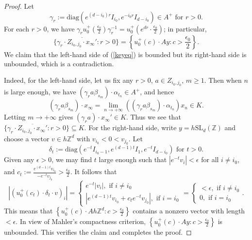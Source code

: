 \documentclass[10pt,a4paper]{amsart}
\newcommand{\SL}{\mathrm{SL}}
\newcommand{\ZZ}{\mathbb{Z}}
\newcommand{\diag}{\mathrm{diag}}
\begin{document}
\begin{proof}
	Let \begin{equation*}
		\gamma_r:=\diag(e^{(d-i_0)r}I_{i_0},e^{-i_0r}I_{d-i_0})\in A^+ \text{ for } r>0.
	\end{equation*}
	For each $r>0$, we have $\gamma_ru_0^+(\frac{\epsilon_0}{2})\gamma_r^{-1}=u_0^+(e^{dr}\cdot\frac{\epsilon_0}{2})$; in particular, \begin{equation}\label{keyeq}
		\{\gamma_r\cdot \overline{Z_{i_0,j_0}\cdot x_{\infty}'}:r>0\}=\left\{u_0^+(c)\cdot Ay:c>\frac{\epsilon_0}{2}\right\}.
	\end{equation}
	We claim that the left-hand side of (\ref{keyeq}) is bounded but its right-hand side is unbounded, which is a contradiction.
	
	Indeed, for the left-hand side, let us fix any $r>0$, $a\in Z_{i_0,j_0}$, $m\geq 1$. Then when $n$ is large enough, we have $(\gamma_r a \beta_{s_m})\cdot \alpha_{t_n}\in A^+$, and hence 
	\begin{equation*}
		(\gamma_r a \beta_{s_m})\cdot x_{\infty}=\lim\limits_{n\to +\infty}\left((\gamma_r a \beta_{s_m})\cdot\alpha_{t_n}\right)x_n\in K.
	\end{equation*}
	Letting $m\to +\infty$ gives $(\gamma_ra)\cdot x_{\infty}'\in K$. Thus we see that $\{\gamma_r\cdot \overline{Z_{i_0,j_0}\cdot x_{\infty}'}:r>0\}\subseteq K$. For the right-hand side, write $y=h\SL_d(\ZZ)$ and choose a vector $v\in h\ZZ^d$ with $v_{i_0}<0<v_{j_0}$. Let \begin{equation*}
		\delta_t:=\diag(e^{-t}I_{i_0-1},e^{(d-1)t}I_1,e^{-t}I_{d-i_0}) \text{ for }t>0.
	\end{equation*}
	Given any $\epsilon>0$, we may find $t$ large enough such that $|e^{-t}v_i|<\epsilon$ for all $i\neq i_0$, and $c_t:=\frac{e^{(d-1)t}v_{i_0}}{-e^{-t}v_{j_0}}>\frac{\epsilon_0}{2}$. It follows that
	\begin{equation*}
		|(u_0^+(c_t)\cdot \delta_t\cdot v)_i|=\begin{cases}
			e^{-t}|v_i|, \text{ if }i\neq i_0\\
			|e^{(d-1)t}v_{i_0}+c_te^{-t}v_{j_0}|, \text{ if }i=i_0
		\end{cases}
		=\begin{cases}
			<\epsilon, \text{ if }i\neq i_0\\
			0, \text{ if }i=i_0
		\end{cases}.
	\end{equation*}
	This means that $\left\{u_0^+(c)\cdot Ah\ZZ^d:c>\frac{\epsilon_0}{2}\right\}$ contains a nonzero vector with length $<\epsilon$. In view of Mahler's compactness criterion, $\left\{u_0^+(c)\cdot Ay:c>\frac{\epsilon_0}{2}\right\}$ is unbounded. This verifies the claim and completes the proof.
\end{proof}
\end{document}
